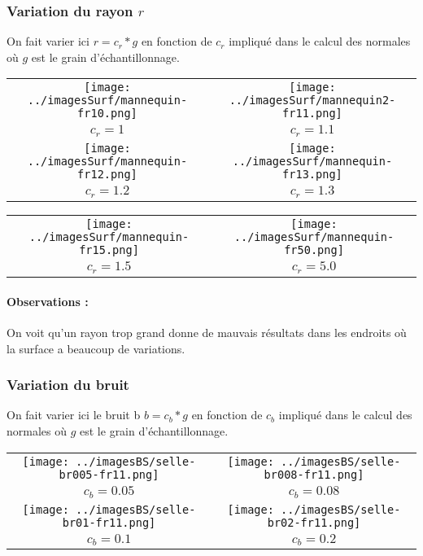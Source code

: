 \documentclass[11pt,a4paper]{article}
\begin{document}
\pagebreak

\subsubsection{Variation du rayon $r$}
On fait varier ici $r=c_r*g$ en fonction de $c_r$ impliqué dans le calcul des normales où $g$ est le grain d'échantillonnage.

\begin{center}
\begin{tabular}{|c|c|}
\hline
\texttt{[image: ../imagesSurf/mannequin-fr10.png]} & \texttt{[image: ../imagesSurf/mannequin2-fr11.png]}\\
$c_r=1$                                                       & $c_r=1.1$\\
\hline
\texttt{[image: ../imagesSurf/mannequin-fr12.png]} & \texttt{[image: ../imagesSurf/mannequin-fr13.png]}\\
$c_r=1.2$                                                     & $c_r=1.3$\\
\hline
\end{tabular}
\begin{tabular}{|c|c|}
\hline
\texttt{[image: ../imagesSurf/mannequin-fr15.png]} & \texttt{[image: ../imagesSurf/mannequin-fr50.png]}\\
$c_r=1.5$  & $c_r=5.0$\\
\hline
\end{tabular}
\end{center}

\paragraph{Observations :}On voit qu'un rayon trop grand donne de mauvais résultats dans les endroits où la surface a
beaucoup de variations.

\pagebreak

\subsubsection{Variation du bruit}
On fait varier ici le bruit b $b=c_b*g$ en fonction de $c_b$ impliqué dans le calcul des normales où $g$ est le grain d'échantillonnage.

\begin{center}
\begin{tabular}{|c|c|}
\hline
\texttt{[image: ../imagesBS/selle-br005-fr11.png]} & \texttt{[image: ../imagesBS/selle-br008-fr11.png]}\\
$c_b=0.05$                                                       & $c_b=0.08$\\
\hline
\texttt{[image: ../imagesBS/selle-br01-fr11.png]} & \texttt{[image: ../imagesBS/selle-br02-fr11.png]}\\
$c_b=0.1$                                                     & $c_b=0.2$\\
\hline
\end{tabular}
\end{center}


 
\end{document}
